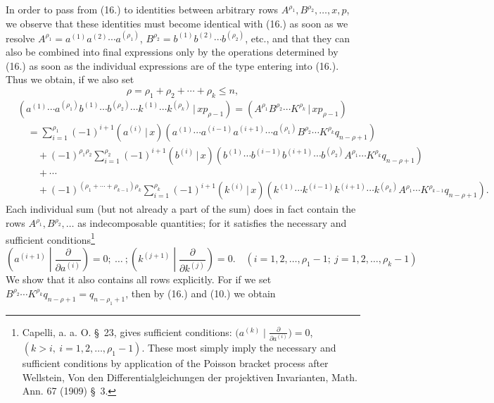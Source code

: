 \documentclass[11pt]{article}
\newcommand{\pair}[2]{(#1\,|\,#2)}
\begin{document}
In order to pass from (16.) to identities between arbitrary rows $A^{\rho_1},B^{\rho_2},\ldots,x,p$, we observe that these identities must become identical with (16.) as soon as we resolve
$A^{\rho_1}=a^{(1)}a^{(2)}\cdots a^{(\rho_1)}$, $B^{\rho_2}=b^{(1)}b^{(2)}\cdots b^{(\rho_2)}$, etc., and that they can also be combined into final expressions only by the operations determined by (16.) as soon as the individual expressions are of the type entering into (16.). Thus we obtain, if we also set
\begin{equation}
 \rho=\rho_1+\rho_2+\cdots+\rho_k\le n,
\tag{18}
\end{equation}
\begin{align*}
&\pair{a^{(1)}\cdots a^{(\rho_1)}b^{(1)}\cdots b^{(\rho_2)}\cdots k^{(1)}\cdots k^{(\rho_k)}}{xp_{\rho-1}}
  =\pair{A^{\rho_1}B^{\rho_2}\cdots K^{\rho_k}}{xp_{\rho-1}} \\
&\quad=\sum_{i=1}^{\rho_1}(-1)^{i+1}\pair{a^{(i)}}{x}(a^{(1)}\cdots a^{(i-1)}a^{(i+1)}\cdots a^{(\rho_1)}B^{\rho_2}\cdots K^{\rho_k}q_{n-\rho+1})\\
&\qquad+(-1)^{\rho_1\rho_2}\sum_{i=1}^{\rho_2}(-1)^{i+1}\pair{b^{(i)}}{x}(b^{(1)}\cdots b^{(i-1)}b^{(i+1)}\cdots b^{(\rho_2)}A^{\rho_1}\cdots K^{\rho_k}q_{n-\rho+1})\\
&\qquad+\cdots\\
&\qquad+(-1)^{(\rho_1+\cdots+\rho_{k-1})\rho_k}\sum_{i=1}^{\rho_k}(-1)^{i+1}\pair{k^{(i)}}{x}(k^{(1)}\cdots k^{(i-1)}k^{(i+1)}\cdots k^{(\rho_k)}A^{\rho_1}\cdots K^{\rho_{k-1}}q_{n-\rho+1}).
\end{align*}
Each individual sum (but not already a part of the sum) does in fact contain the rows $A^{\rho_1},B^{\rho_2},\ldots$ as indecomposable quantities; for it satisfies the necessary and sufficient conditions\footnote{Capelli, a. a. O. \S\ 23, gives sufficient conditions: $\bigl(a^{(k)}\mid \frac{\partial}{\partial a^{(i)}}\bigr)=0$, $(k>i,\ i=1,2,\ldots,\rho_1-1)$. These most simply imply the necessary and sufficient conditions by application of the Poisson bracket process after Wellstein, Von den Differentialgleichungen der projektiven Invarianten, Math. Ann. 67 (1909) \S\ 3.}
\begin{equation}
 \left(a^{(i+1)}\middle|\frac{\partial}{\partial a^{(i)}}\right)=0;\ \ldots\ ;
 \left(k^{(j+1)}\middle|\frac{\partial}{\partial k^{(j)}}\right)=0.
 \quad (i=1,2,\ldots,\rho_1-1;\ j=1,2,\ldots,\rho_k-1)
\tag{19}
\end{equation}
We show that it also contains all rows explicitly. For if we set $B^{\rho_2}\cdots K^{\rho_k}q_{n-\rho+1}=q_{n-\rho_1+1}$, then by (16.) and (10.) we obtain
\end{document}
